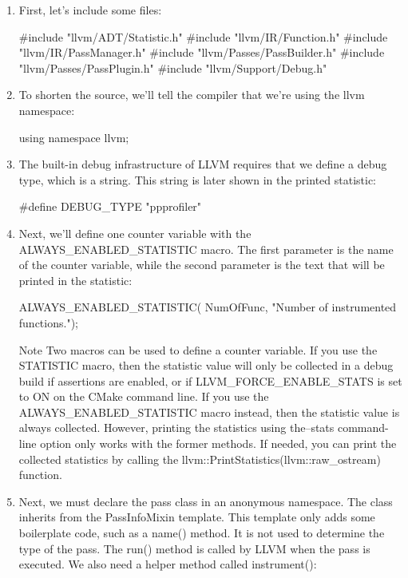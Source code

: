\begin{enumerate}
\item
First, let’s include some files:

\begin{cpp}
#include "llvm/ADT/Statistic.h"
#include "llvm/IR/Function.h"
#include "llvm/IR/PassManager.h"
#include "llvm/Passes/PassBuilder.h"
#include "llvm/Passes/PassPlugin.h"
#include "llvm/Support/Debug.h"
\end{cpp}

\item
To shorten the source, we’ll tell the compiler that we’re using the llvm namespace:

\begin{cpp}
using namespace llvm;
\end{cpp}

\item
The built-in debug infrastructure of LLVM requires that we define a debug type, which is a string. This string is later shown in the printed statistic:

\begin{cpp}
#define DEBUG_TYPE "ppprofiler"
\end{cpp}

\item
Next, we’ll define one counter variable with the ALWAYS\_ENABLED\_STATISTIC macro. The first parameter is the name of the counter variable, while the second parameter is the text that will be printed in the statistic:

\begin{cpp}
ALWAYS_ENABLED_STATISTIC(
    NumOfFunc, "Number of instrumented functions.");
\end{cpp}

\begin{myNotic}{Note}
Two macros can be used to define a counter variable. If you use the STATISTIC macro, then the statistic value will only be collected in a debug build if assertions are enabled, or if LLVM\_FORCE\_ENABLE\_STATS is set to ON on the CMake command line. If you use the ALWAYS\_ENABLED\_STATISTIC macro instead, then the statistic value is always collected. However, printing the statistics using the–stats command-line option only works with the former methods. If needed, you can print the collected statistics by calling the llvm::PrintStatistics(llvm::raw\_ostream) function.
\end{myNotic}

\item
Next, we must declare the pass class in an anonymous namespace. The class inherits from the PassInfoMixin template. This template only adds some boilerplate code, such as a name() method. It is not used to determine the type of the pass. The run() method is called by LLVM when the pass is executed. We also need a helper method called instrument():


\end{enumerate}
